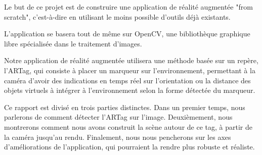 
Le but de ce projet est de construire une application de réalité augmentée "from scratch", c'est-à-dire en utilisant le moins possible d'outils déjà existants.

L'application se basera tout de même sur OpenCV, une bibliothèque graphique libre spécialisée dans le traitement d'images.

Notre application de réalité augmentée utilisera une méthode basée sur un repère, l'ARTag, qui consiste à placer un marqueur sur l'environnement, permettant à la caméra d'avoir des indications en temps réel sur l'orientation ou la distance des objets virtuels à intégrer à l'environnement selon la forme détectée du marqueur. 

Ce rapport est divisé en trois parties distinctes. Dans un premier temps, nous parlerons de comment détecter l'ARTag sur l'image. Deuxièmement, nous montrerons comment nous avons construit la scène autour de ce tag, à partir de la caméra jusqu'au rendu. Finalement, nous nous pencherons sur les axes d'améliorations de l'application, qui pourraient la rendre plus robuste et réaliste.